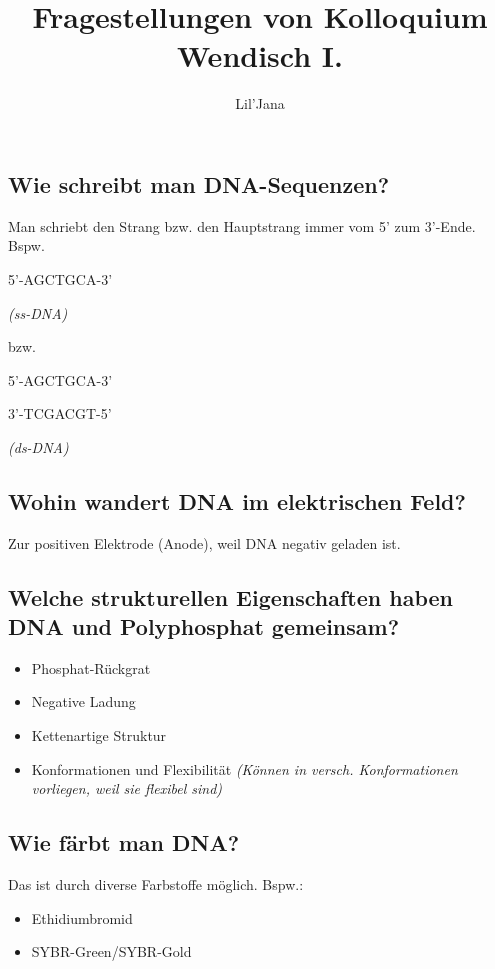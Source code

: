 \documentclass{article}
\title{Fragestellungen von Kolloquium Wendisch I.}
\author{Lil'Jana}
\begin{document}
\maketitle
\subsection*{Wie schreibt man DNA-Sequenzen?}
Man schriebt den Strang bzw. den Hauptstrang immer vom 5' zum 3'-Ende. \newline
Bspw. 
\begin{center}
    5'-AGCTGCA-3' 
\end{center}
\begin{center}
    \textit{(ss-DNA)}
\end{center}
  bzw. \newline
\centerline{5'-AGCTGCA-3'}
\centerline{3'-TCGACGT-5'}
 \begin{center}
    \textit{(ds-DNA)}
\end{center}


\subsection*{Wohin wandert DNA im elektrischen Feld?}
Zur positiven Elektrode (Anode), weil DNA negativ geladen ist.

\subsection*{Welche strukturellen Eigenschaften haben DNA und Polyphosphat gemeinsam? }
\begin{itemize}
    \item Phosphat-Rückgrat
    \item Negative Ladung
    \item Kettenartige Struktur
    \item Konformationen und Flexibilität \textit{(Können in versch. Konformationen vorliegen, weil sie flexibel sind)}
\end{itemize}

\subsection*{Wie färbt man DNA?}
Das ist durch diverse Farbstoffe möglich. Bspw.: 
\begin{itemize}
    \item Ethidiumbromid
    \item SYBR-Green/SYBR-Gold
\end{itemize}
\end{document}
